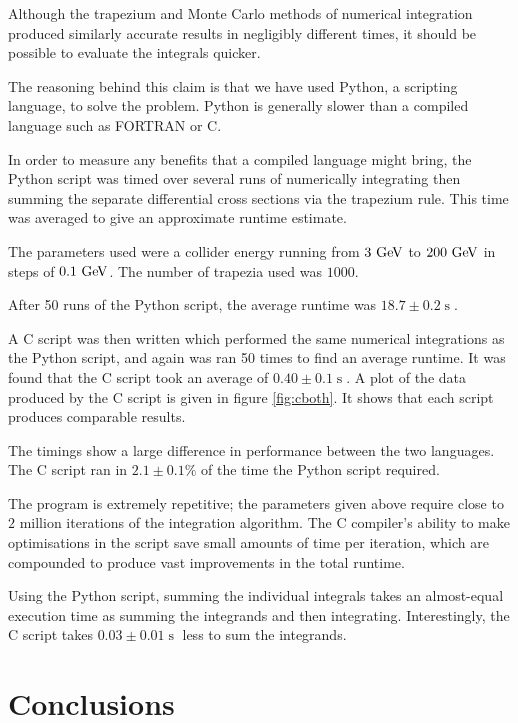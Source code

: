 \documentclass[]{article}
\begin{document}
Although the trapezium and Monte Carlo methods of numerical integration produced similarly accurate results in negligibly different times, it should be possible to evaluate the integrals quicker.

The reasoning behind this claim is that we have used Python, a scripting language, to solve the problem. Python is generally slower than a compiled language such as FORTRAN or C.

In order to measure any benefits that a compiled language might bring, the Python script was timed over several runs of numerically integrating then summing the separate differential cross sections via the trapezium rule. This time was averaged to give an approximate runtime estimate.

The parameters used were a collider energy running from $3\GeV$ to $200\GeV$ in steps of $0.1\GeV$. The number of trapezia used was $1000$.

After 50 runs of the Python script, the average runtime was $18.7 \pm 0.2 \operatorname{s}$.

A C script was then written which performed the same numerical integrations as the Python script, and again was ran 50 times to find an average runtime. It was found that the C script took an average of $0.40 \pm 0.1 \operatorname{s}$. A plot of the data produced by the C script is given in figure \ref{fig:cboth}. It shows that each script produces comparable results.

The timings show a large difference in performance between the two languages. The C script ran in $2.1\pm0.1\%$ of the time the Python script required.

The program is extremely repetitive; the parameters given above require close to $2$ million iterations of the integration algorithm. The C compiler's ability to make optimisations in the script save small amounts of time per iteration, which are compounded to produce vast improvements in the total runtime.

Using the Python script, summing the individual integrals takes an almost-equal execution time as summing the integrands and then integrating. Interestingly, the C script takes $0.03\pm0.01\operatorname{s}$ less to sum the integrands.

\section{Conclusions}\label{sec:conclusion}
\end{document}

